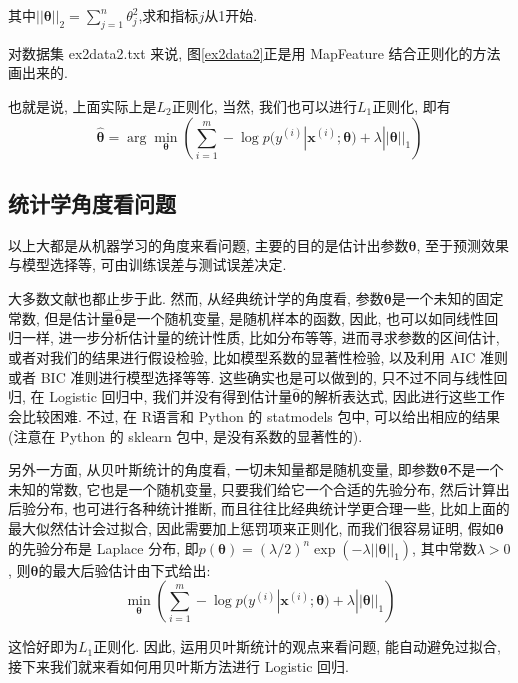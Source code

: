 \documentclass[a4paper,UTF8]{ctexart}
\theoremstyle{plain} \newtheorem{theorem}{定理}[section]
\theoremstyle{plain} \newtheorem{definition}{定义}[section]
\theoremstyle{plain} \newtheorem{lemma}{引理}[section]
\theoremstyle{plain} \newtheorem{proposition}{命题}[section]
\theoremstyle{plain} \newtheorem{example}{例}[section]
\theoremstyle{plain} \newtheorem{remark}{注}[section]
\theoremstyle{plain} \newtheorem{corollary}{推论}[section]
\begin{document}
其中$||\bm{\theta}||_{2} = \sum\limits_{j=1}^{n} \theta_{j}^{2}$,求和指标$j$从1开始.

对数据集 ex2data2.txt 来说, 图\ref{ex2data2}正是用 MapFeature 结合正则化的方法画出来的.

也就是说, 上面实际上是$L_{2}$正则化, 当然, 我们也可以进行$L_{1}$正则化, 即有
\begin{equation*}
\hat{\bm{\theta}} = \arg \min_{\bm{\theta}} \left( \sum_{i=1}^{m} - \log p(y^{(i)} | \bm{x}^{(i)}; \bm{\theta}) + \lambda ||\bm{\theta}||_{1} \right)
\end{equation*}



\subsection{统计学角度看问题}
以上大都是从机器学习的角度来看问题, 主要的目的是估计出参数$\bm{\theta}$, 至于预测效果与模型选择等, 可由训练误差与测试误差决定.

大多数文献也都止步于此. 然而, 从经典统计学的角度看, 参数$\bm{\theta}$是一个未知的固定常数, 但是估计量$\hat{\bm{\theta}}$是一个随机变量, 是随机样本的函数, 因此, 也可以如同线性回归一样, 进一步分析估计量的统计性质, 比如分布等等, 进而寻求参数的区间估计, 或者对我们的结果进行假设检验, 比如模型系数的显著性检验, 以及利用 AIC 准则或者 BIC 准则进行模型选择等等. 这些确实也是可以做到的, 只不过不同与线性回归, 在 Logistic 回归中, 我们并没有得到估计量$\hat{\bm{\theta}}$的解析表达式, 因此进行这些工作会比较困难. 不过, 在  R语言和 Python 的 statmodels 包中, 可以给出相应的结果(注意在 Python 的 sklearn 包中, 是没有系数的显著性的).

另外一方面, 从贝叶斯统计的角度看, 一切未知量都是随机变量, 即参数$\bm{\theta}$不是一个未知的常数, 它也是一个随机变量, 只要我们给它一个合适的先验分布, 然后计算出后验分布, 也可进行各种统计推断, 而且往往比经典统计学更合理一些, 比如上面的最大似然估计会过拟合, 因此需要加上惩罚项来正则化, 而我们很容易证明, 假如$\bm{\theta}$的先验分布是 Laplace 分布, 即$p(\bm{\theta})  = (\lambda / 2)^{n} \exp (- \lambda ||\bm{\theta}||_{1})$, 其中常数$\lambda > 0$, 则$\bm{\theta}$的最大后验估计由下式给出:
\begin{equation*}
\min_{\bm{\theta}} \left( \sum_{i=1}^{m} - \log p(y^{(i)} | \bm{x}^{(i)}; \bm{\theta}) + \lambda ||\bm{\theta}||_{1} \right)
\end{equation*}

这恰好即为$L_{1}$正则化. 因此, 运用贝叶斯统计的观点来看问题, 能自动避免过拟合, 接下来我们就来看如何用贝叶斯方法进行 Logistic 回归.
\end{document}
